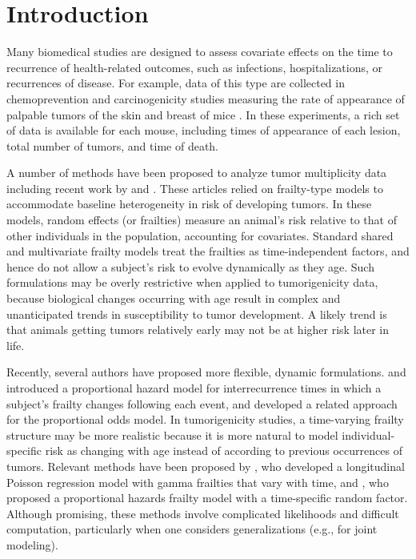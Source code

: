 \documentclass[10pt, letterpaper]{article}
\begin{document}
\section{Introduction}

Many biomedical studies are designed to assess covariate effects on the time to recurrence of health-related outcomes, such as infections, hospitalizations, or recurrences of disease. For example, data of this type are collected in chemoprevention and carcinogenicity studies measuring the rate of appearance of palpable tumors of the skin and breast of mice \citep{Gail1980, Forbes1998, Dunson2000}. In these experiments, a rich set of data is available for each mouse, including times of appearance of each lesion, total number of tumors, and time of death.

A number of methods have been proposed to analyze tumor multiplicity data including recent work by \citet{Dunson2000b} and \citet{Sinha2002b}. These articles relied on frailty-type models \citep{Vaupel1979, Clayton1985} to accommodate baseline heterogeneity in risk of developing tumors. In these models, random effects (or frailties) measure an animal's risk relative to that of other individuals in the population, accounting for covariates. Standard shared and multivariate \citep{Sargent1998} frailty models treat the frailties as time-independent factors, and hence do not allow a subject's risk to evolve dynamically as they age. Such formulations may be overly restrictive when applied to tumorigenicity data, because biological changes occurring with age result in complex and unanticipated trends in susceptibility to tumor development. A likely trend is that animals getting tumors relatively early may not be at higher risk later in life.

Recently, several authors have proposed more flexible, dynamic formulations. \citet{Yue1997} and \citet{Yau1998} introduced a proportional hazard model for interrecurrence times in which a subject's frailty changes following each event, and \citet{Lam2002} developed a related approach for the proportional odds model. In tumorigenicity studies, a time-varying frailty structure may be more realistic because it is more natural to model individual-specific risk as changing with age instead of according to previous occurrences of tumors. Relevant methods have been proposed by \citet{Henderson2003}, who developed a longitudinal Poisson regression model with gamma frailties that vary with time, and \citet{Paik1994}, who proposed a proportional hazards frailty model with a time-specific random factor. Although promising, these methods involve complicated likelihoods and difficult computation, particularly when one considers generalizations (e.g., for joint modeling).
\end{document}
